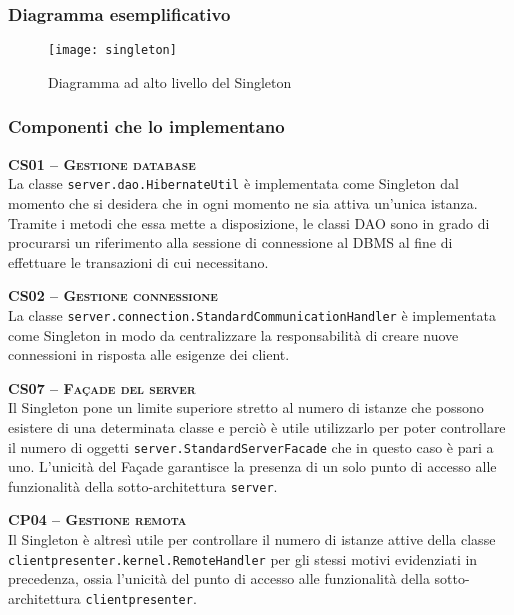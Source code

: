 \subsubsection{Diagramma esemplificativo}
\begin{figure}[H]
\centering
\texttt{[image: singleton]}
\caption{Diagramma ad alto livello del  Singleton}\label{fig:singleton}
\end{figure}

\subsubsection{Componenti che lo implementano}
\begin{description}
  \item{\scshape\bfseries CS01 -- Gestione database}\\
La classe \texttt{server.dao.HibernateUtil} è implementata come Singleton dal momento che si desidera che in ogni momento ne sia attiva un'unica istanza. Tramite i metodi che essa mette a disposizione, le classi DAO sono in grado di procurarsi un riferimento alla sessione di connessione al DBMS al fine di effettuare le transazioni di cui necessitano.
  
  \item{\scshape\bfseries CS02 -- Gestione connessione}\\
La classe \texttt{server.connection.StandardCommunicationHandler} è implementata come Singleton in modo da centralizzare la responsabilità di creare nuove connessioni in risposta alle esigenze dei client.

  \item{\scshape\bfseries CS07 -- Façade del server}\\
Il  Singleton pone un limite superiore stretto al numero di istanze che possono esistere di una determinata classe e perciò è utile utilizzarlo per poter controllare il numero di oggetti \texttt{server.StandardServerFacade} che in questo caso è pari a uno. L'unicità del Façade garantisce la presenza di un solo punto di accesso alle funzionalità della sotto-architettura \texttt{server}.

  \item{\scshape\bfseries CP04 -- Gestione remota}\\
Il  Singleton è altresì utile per controllare il numero di istanze attive della classe \texttt{clientpresenter.kernel.RemoteHandler} per gli stessi motivi evidenziati in precedenza, ossia l'unicità del punto di accesso alle funzionalità della sotto-architettura \texttt{clientpresenter}.

\end{description}

